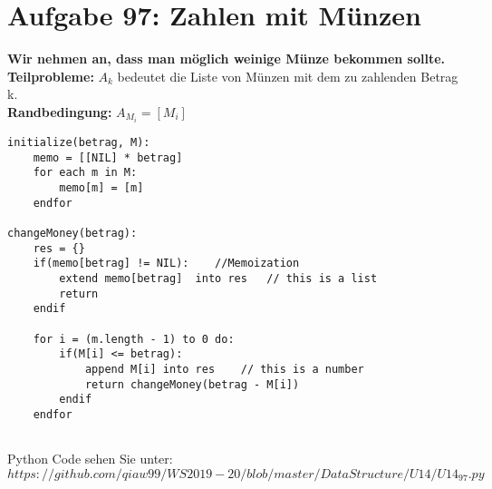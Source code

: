 \documentclass{article}
\begin{document}
\section{Aufgabe 97: Zahlen mit Münzen}
\textbf{Wir nehmen an, dass man möglich weinige Münze bekommen sollte.} \\ 
\textbf{Teilprobleme:} $A_k$ bedeutet die Liste von Münzen mit dem zu zahlenden Betrag k. \\
\textbf{Randbedingung:} $A_{M_i} = [M_i]$\\
\begin{lstlisting}
initialize(betrag, M):	
	memo = [[NIL] * betrag]
	for each m in M:
		memo[m] = [m]
	endfor
	
changeMoney(betrag):
	res = {}
	if(memo[betrag] != NIL):	//Memoization
		extend memo[betrag]	 into res	// this is a list
		return 
	endif
	
	for i = (m.length - 1) to 0 do:
		if(M[i] <= betrag):
			append M[i] into res	// this is a number
			return changeMoney(betrag - M[i])
		endif
	endfor
	
\end{lstlisting}
Python Code sehen Sie unter: $https://github.com/qiaw99/WS2019-20/blob/master/DataStructure/U14/U14_97.py$
\end{document}
